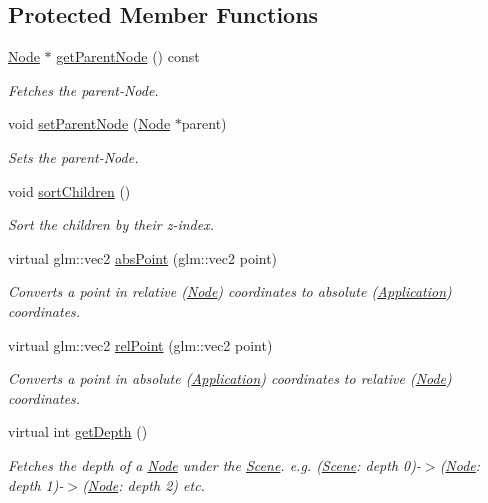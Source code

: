 \subsection*{Protected Member Functions}
\begin{DoxyCompactItemize}
\item 
\mbox{\hyperlink{classsage_1_1Node}{Node}} $\ast$ \mbox{\hyperlink{classsage_1_1Node_a6f20a4c713eb7044d63d62fe110ebf39}{get\+Parent\+Node}} () const
\begin{DoxyCompactList}\small\item\em Fetches the parent-\/\+Node. \end{DoxyCompactList}\item 
void \mbox{\hyperlink{classsage_1_1Node_ad916f8953f6b38ef3514a37f75f9c20d}{set\+Parent\+Node}} (\mbox{\hyperlink{classsage_1_1Node}{Node}} $\ast$parent)
\begin{DoxyCompactList}\small\item\em Sets the parent-\/\+Node. \end{DoxyCompactList}\item 
void \mbox{\hyperlink{classsage_1_1Node_aa7d796f1bad7d0e23a4cdd2575b4b9f3}{sort\+Children}} ()
\begin{DoxyCompactList}\small\item\em Sort the children by their z-\/index. \end{DoxyCompactList}\item 
virtual glm\+::vec2 \mbox{\hyperlink{classsage_1_1Node_a1c8fbbf37b6e9cf6c7f5e0a4ae4a73cb}{abs\+Point}} (glm\+::vec2 point)
\begin{DoxyCompactList}\small\item\em Converts a point in relative (\mbox{\hyperlink{classsage_1_1Node}{Node}}) coordinates to absolute (\mbox{\hyperlink{classsage_1_1Application}{Application}}) coordinates. \end{DoxyCompactList}\item 
virtual glm\+::vec2 \mbox{\hyperlink{classsage_1_1Node_a602f53d66ee202b54ae71b9a53057173}{rel\+Point}} (glm\+::vec2 point)
\begin{DoxyCompactList}\small\item\em Converts a point in absolute (\mbox{\hyperlink{classsage_1_1Application}{Application}}) coordinates to relative (\mbox{\hyperlink{classsage_1_1Node}{Node}}) coordinates. \end{DoxyCompactList}\item 
virtual int \mbox{\hyperlink{classsage_1_1Node_a303fffee8f70d39603b3a4e251e2e820}{get\+Depth}} ()
\begin{DoxyCompactList}\small\item\em Fetches the depth of a \mbox{\hyperlink{classsage_1_1Node}{Node}} under the \mbox{\hyperlink{classsage_1_1Scene}{Scene}}. e.\+g. (\mbox{\hyperlink{classsage_1_1Scene}{Scene}}\+: depth 0)-\/$>$(\mbox{\hyperlink{classsage_1_1Node}{Node}}\+: depth 1)-\/$>$(\mbox{\hyperlink{classsage_1_1Node}{Node}}\+: depth 2) etc. \end{DoxyCompactList}\end{DoxyCompactItemize}
